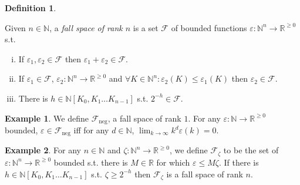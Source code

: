 \documentclass{article}
\numberwithin{equation}{section}
\theoremstyle{definition}
\newtheorem{definition}{Definition}[section]
\newtheorem{example}{Example}[section]
\theoremstyle{plain}
\newcommand{\Nats}{\mathbb{N}}
\newcommand{\Reals}{\mathbb{R}}
\newcommand{\NatPoly}{\Nats[K_0, K_1 \ldots K_{n-1}]}
\newcommand{\NatFun}{\Nats^n \rightarrow}
\newcommand{\Lim}[1]{\lim_{#1 \rightarrow \infty}}
\newcommand{\Fall}{\mathcal{F}}
\begin{document}
\begin{definition}
\label{def:fall}

Given $n \in \Nats$, a \emph{fall space of rank $n$} is a set $\Fall$ of bounded functions $\varepsilon: \NatFun \Reals^{\geq 0}$ s.t.

\begin{enumerate}[(i)]

\item\label{con:def__fall__add} If $\varepsilon_1, \varepsilon_2 \in \Fall$ then $\varepsilon_1 + \varepsilon_2 \in \Fall$.

\item\label{con:def__fall__ineq} If $\varepsilon_1 \in \Fall$, $\varepsilon_2: \NatFun \Reals^{\geq 0}$ and $\forall K \in \Nats^n: \varepsilon_2(K) \leq \varepsilon_1(K)$ then $\varepsilon_2 \in \Fall$.

\item\label{con:def__fall__pol} There is $h \in \NatPoly$ s.t. $2^{-h} \in \Fall$.

\end{enumerate}
\end{definition}

\begin{example}

We define $\Fall_{\text{neg}}$, a fall space of rank $1$. For any $\varepsilon: \Nats \rightarrow \Reals^{\geq 0}$ bounded, $\varepsilon \in \Fall_{\text{neg}}$ iff for any $d \in \Nats$, $\Lim{k} k^d \varepsilon(k) = 0$.

\end{example}

\begin{samepage}
\begin{example}

For any ${n \in \Nats}$ and ${\zeta: \Nats^n \rightarrow \Reals^{\geq 0}}$, we define ${\Fall_{\zeta}}$ to be the set of ${\varepsilon: \NatFun \Reals^{\geq 0}}$ bounded s.t. there is ${M \in \Reals}$ for which ${\varepsilon \leq M \zeta}$. If there is ${h \in \NatPoly}$ s.t. ${\zeta \geq 2^{-h}}$ then ${\Fall_\zeta}$ is a fall space of rank ${n}$.

\end{example}
\end{samepage}
\end{document}
